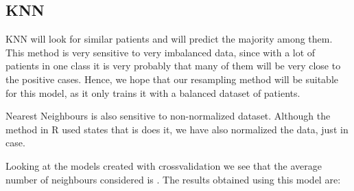 \subsection{KNN}

KNN will look for similar patients and will predict the majority among them. This method is very sensitive to very imbalanced data, since with a lot of patients in one class it is very probably that many of them will be very close to the positive cases. Hence, we hope that our resampling method will be suitable for this model, as it only trains it with a balanced dataset of patients.

Nearest Neighbours is also sensitive to non-normalized dataset. Although the method in R used states that is does it, we have also normalized the data, just in case.


Looking at the models created with crossvalidation we see that the average number of neighbours considered is . The results obtained using this model are:



